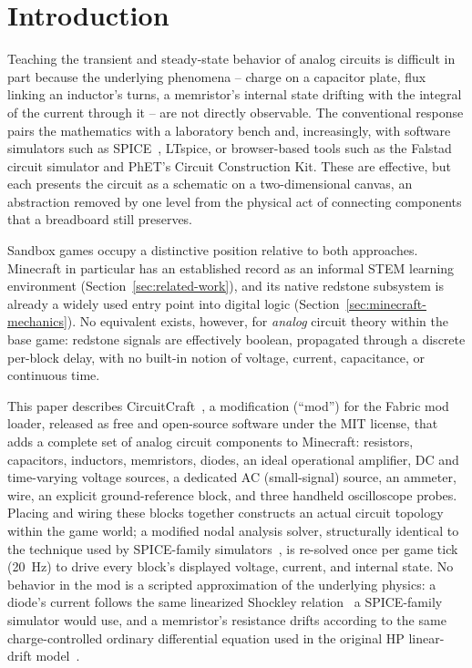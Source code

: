 \section{Introduction}
\label{sec:introduction}

Teaching the transient and steady-state behavior of analog circuits is difficult in part
because the underlying phenomena -- charge on a capacitor plate, flux linking an inductor's
turns, a memristor's internal state drifting with the integral of the current through it --
are not directly observable. The conventional response pairs the mathematics with a
laboratory bench and, increasingly, with software simulators such as
SPICE~\cite{nagel1973spice}, LTspice, or browser-based tools such as the Falstad circuit
simulator and PhET's Circuit Construction Kit. These are effective, but each presents the
circuit as a schematic on a two-dimensional canvas, an abstraction removed by one level from
the physical act of connecting components that a breadboard still preserves.

Sandbox games occupy a distinctive position relative to both approaches. Minecraft in
particular has an established record as an informal STEM learning environment
(Section~\ref{sec:related-work}), and its native redstone subsystem is already a widely used
entry point into digital logic (Section~\ref{sec:minecraft-mechanics}). No equivalent exists,
however, for \emph{analog} circuit theory within the base game: redstone signals are
effectively boolean, propagated through a discrete per-block delay, with no built-in notion
of voltage, current, capacitance, or continuous time.

This paper describes CircuitCraft~\cite{picos2026circuitcraft}, a modification (``mod'') for
the Fabric mod loader, released as free and open-source software under the MIT license, that
adds a complete set of analog circuit components to Minecraft: resistors, capacitors,
inductors, memristors, diodes, an ideal operational amplifier, DC and time-varying voltage
sources, a dedicated AC (small-signal) source, an ammeter, wire, an explicit
ground-reference block, and three handheld oscilloscope probes. Placing and wiring these
blocks together constructs an actual circuit topology within the game world; a modified
nodal analysis solver, structurally identical to the technique used by SPICE-family
simulators~\cite{ho1975mna}, is re-solved once per game tick (20~Hz) to drive every block's
displayed voltage, current, and internal state. No behavior in the mod is a scripted
approximation of the underlying physics: a diode's current follows the same linearized
Shockley relation~\cite{shockley1949diode} a SPICE-family simulator would use, and a
memristor's resistance drifts according to the same charge-controlled ordinary differential
equation used in the original HP linear-drift model~\cite{strukov2008missing}.

